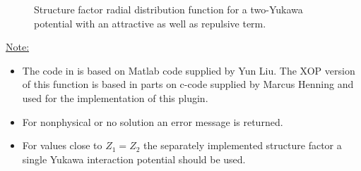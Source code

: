 \begin{figure}[htb]
\captionsetup[subfigure]{position=b}
\centering
{}
\hfill
{}
\caption{Structure factor radial distribution function for a two-Yukawa potential with an attractive as well as repulsive term.}
\label{fig:Yukawa}
\end{figure}

\noindent\underline{Note:}
\begin{itemize}
  \item The code in \SASfit is based on Matlab code supplied by Yun Liu. The XOP version of this function is based in parts on c-code supplied by Marcus Henning and used for the implementation of this plugin.
  \item For nonphysical or no solution an error message is returned.
  \item For values close to $Z_1=Z_2$ the separately implemented structure factor a single Yukawa interaction potential should be used.
\end{itemize} 